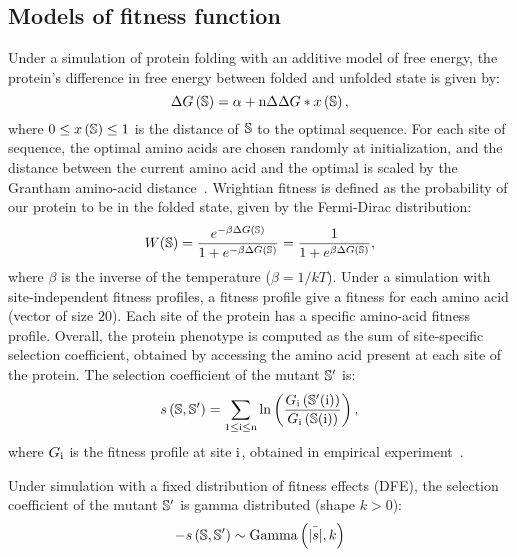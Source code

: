 \subsection{Models of fitness function}
\label{MatMet:folding}

Under a simulation of protein folding with an additive model of free energy, the protein's difference in free energy between folded and unfolded state is given by:
\begin{equation*}
    \Delta G\left(\mathbb{S}\right) = \alpha + \text{n} \Delta \Delta G * x\left(\mathbb{S}\right),
\end{equation*}
where $0 \leq x\left(\mathbb{S}\right) \leq 1$ is the distance of $\mathbb{S}$ to the optimal sequence.
For each site of sequence, the optimal amino acids are chosen randomly at initialization, and the distance between the current amino acid and the optimal is scaled by the Grantham amino-acid distance~\citep{Grantham1974}.
Wrightian fitness is defined as the probability of our protein to be in the folded state, given by the Fermi-Dirac distribution:
\begin{equation}
    W (\mathbb{S}) = \dfrac{e^{-\beta \Delta G\left(\mathbb{S}\right) }}{1 + e^{-\beta \Delta G\left(\mathbb{S}\right) }} = \dfrac{1}{1 + e^{\beta \Delta G\left(\mathbb{S}\right) }},
\end{equation}
where $\beta$ is the inverse of the temperature ($\beta=1/kT$).
Under a simulation with site-independent fitness profiles, a fitness profile give a fitness for each amino acid (vector of size $20$).
Each site of the protein has a specific amino-acid fitness profile.
Overall, the protein phenotype is computed as the sum of site-specific selection coefficient, obtained by accessing the amino acid present at each site of the protein.
The selection coefficient of the mutant $\mathbb{S}'$ is:
\begin{equation}
    s \left( \mathbb{S},\mathbb{S}'\right) = \sum\limits_{1 \leq \text{i} \leq \text{n}} \ln \left( \dfrac{G_{\text{i}} \left(\mathbb{S}'(\text{i}) \right)}{G_{\text{i}} \left(\mathbb{S}(\text{i}) \right)} \right) ,
\end{equation}
where $G_{\text{i}}$ is the fitness profile at site $\text{i}$, obtained in empirical experiment~\citep{Bloom2017}.

Under simulation with a fixed distribution of fitness effects (\acrshort{DFE}), the selection coefficient of the mutant $\mathbb{S}'$ is gamma distributed (shape $k > 0$):
\begin{equation}
    - s \left( \mathbb{S},\mathbb{S}'\right) \sim \text{Gamma} \left( \bar{|s|}, k \right)
\end{equation}

